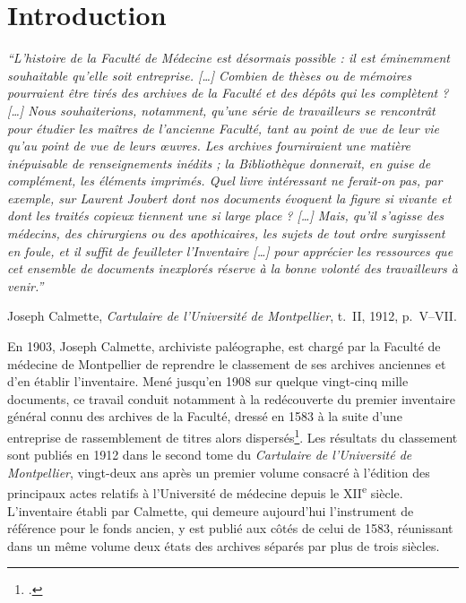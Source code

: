 
\chapter*{Introduction}

\noindent\hfill
\begin{minipage}{0.72\textwidth}
	\small
	\itshape
	\enquote{L’histoire de la Faculté de Médecine est désormais possible : il est éminemment souhaitable qu’elle soit entreprise. […] Combien de thèses ou de mémoires pourraient être tirés des archives de la Faculté et des dépôts qui les complètent ? […] Nous souhaiterions, notamment, qu’une série de travailleurs se rencontrât pour étudier les maîtres de l’ancienne Faculté, tant au point de vue de leur vie qu’au point de vue de leurs œuvres. Les archives fourniraient une matière inépuisable de renseignements inédits ; la Bibliothèque donnerait, en guise de complément, les éléments imprimés. Quel livre intéressant ne ferait-on pas, par exemple, sur Laurent Joubert dont nos documents évoquent la figure si vivante et dont les traités copieux tiennent une si large place ? […] Mais, qu’il s’agisse des médecins, des chirurgiens ou des apothicaires, les sujets de tout ordre surgissent en foule, et il suffit de feuilleter l’Inventaire […] pour apprécier les ressources que cet ensemble de documents inexplorés réserve à la bonne volonté des travailleurs à venir.}
	
	\begin{flushright}
		\normalfont\small
		Joseph Calmette, \emph{Cartulaire de l’Université de Montpellier}, t.~II, 1912, p.~V--VII.
	\end{flushright}
\end{minipage}

\vspace{1.5em}

En 1903, Joseph Calmette, archiviste paléographe, est chargé par la Faculté de médecine de Montpellier de reprendre le classement de ses archives anciennes et d'en établir l'inventaire. Mené jusqu'en 1908 sur quelque vingt-cinq mille documents, ce travail conduit notamment à la redécouverte du premier inventaire général connu des archives de la Faculté, dressé en 1583 à la suite d'une entreprise de rassemblement de titres alors dispersés\footcite[p.~I et XII, vues~20 et 31/1131]{CalmetteCartulaire1912}. Les résultats du classement sont publiés en 1912 dans le second tome du \emph{Cartulaire de l'Université de Montpellier}, vingt-deux ans après un premier volume consacré à l'édition des principaux actes relatifs à l'Université de médecine depuis le XII\textsuperscript{e} siècle. L'inventaire établi par Calmette, qui demeure aujourd'hui l'instrument de référence pour le fonds ancien, y est publié aux côtés de celui de 1583, réunissant dans un même volume deux états des archives séparés par plus de trois siècles.


